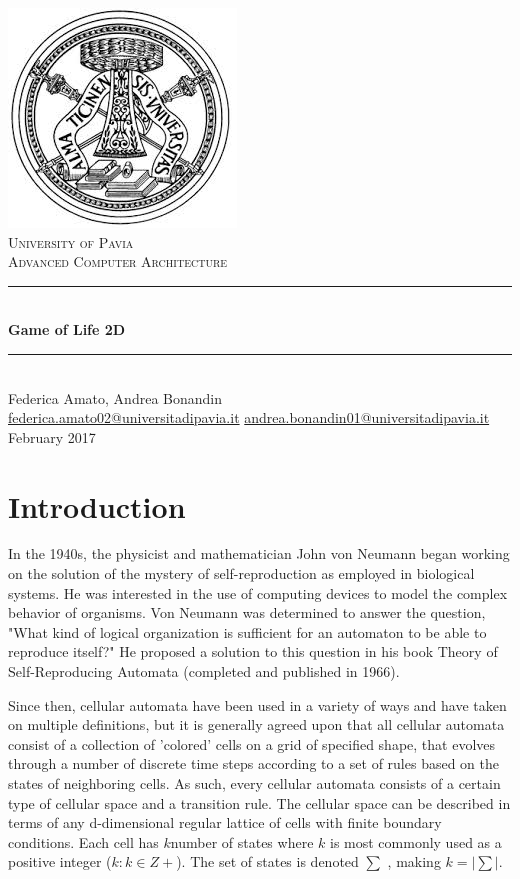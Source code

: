 \documentclass{report}
\begin{document}
\begin{titlepage}
	\centering
	\includegraphics[scale = 0.4]{logo.jpeg}\\[1.0 cm]
	\textsc{\LARGE University of Pavia}\\[1.0 cm]
	\textsc{\Large Advanced Computer Architecture}\\[0.5 cm]
	\rule{\linewidth}{0.2 mm} \\[0.4 cm]
	{\huge{\textbf{Game of Life 2D}}}\\
	\rule{\linewidth}{0.2 mm} \\[1 cm]

	{\large Federica Amato, Andrea Bonandin} \\[0.2 cm]
	\url{federica.amato02@universitadipavia.it}
	\url{andrea.bonandin01@universitadipavia.it} \\[0.2 cm]
	{February 2017}
\end{titlepage}

\tableofcontents

\chapter{Introduction}
In the 1940s, the physicist and mathematician John von Neumann began working
on the solution of the mystery of self-reproduction as employed in biological systems. He was
interested in the use of computing devices to model the complex behavior of organisms.
Von Neumann was determined to answer the question, "What kind of logical organization is sufficient for
an automaton to be able to reproduce itself?" He proposed a solution to this question in
his book Theory of Self-Reproducing Automata (completed and published in 1966).

\noindent Since then, cellular automata have been used in a variety of ways and have taken on multiple
definitions, but it is generally agreed upon that all cellular automata consist of a collection of
'colored' cells on a grid of specified shape, that evolves through a number of discrete time steps
according to a set of rules based on the states of neighboring cells. As such, every cellular
automata consists of a certain type of cellular space and a transition rule. The cellular space can
be described in terms of any d-dimensional regular lattice of cells with finite boundary conditions.
Each cell has $k $number of states where $k$ is most commonly used as a positive integer ($k : k \in Z+$). The set of states is denoted $\sum$ , making $k = |\sum|$. 
\end{document}
